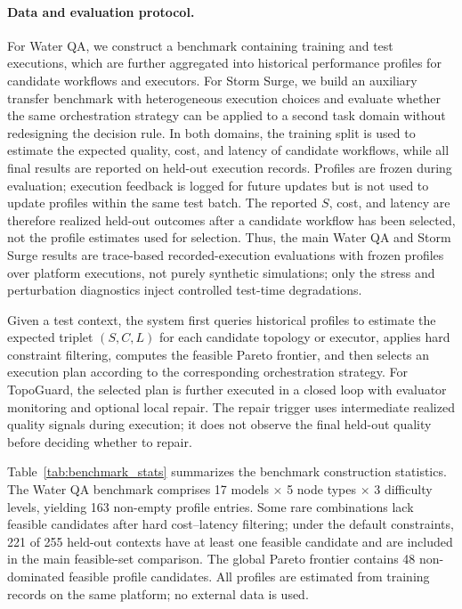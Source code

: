 \documentclass[acmsmall,review,anonymous]{acmart}
\begin{document}
\paragraph{Data and evaluation protocol.}
For Water QA, we construct a benchmark containing training and test executions, which are further aggregated into historical performance profiles for candidate workflows and executors. 
For Storm Surge, we build an auxiliary transfer benchmark with heterogeneous execution choices and evaluate whether the same orchestration strategy can be applied to a second task domain without redesigning the decision rule. 
In both domains, the training split is used to estimate the expected quality, cost, and latency of candidate workflows, while all final results are reported on held-out execution records. Profiles are frozen during evaluation; execution feedback is logged for future updates but is not used to update profiles within the same test batch.
The reported $S$, cost, and latency are therefore realized held-out outcomes after a candidate workflow has been selected, not the profile estimates used for selection.
Thus, the main Water QA and Storm Surge results are trace-based recorded-execution evaluations with frozen profiles over platform executions, not purely synthetic simulations; only the stress and perturbation diagnostics inject controlled test-time degradations.

Given a test context, the system first queries historical profiles to estimate the expected triplet $(S,C,L)$ for each candidate topology or executor, applies hard constraint filtering, computes the feasible Pareto frontier, and then selects an execution plan according to the corresponding orchestration strategy.
For TopoGuard, the selected plan is further executed in a closed loop with evaluator monitoring and optional local repair.
The repair trigger uses intermediate realized quality signals during execution; it does not observe the final held-out quality before deciding whether to repair.

Table~\ref{tab:benchmark_stats} summarizes the benchmark construction statistics. The Water QA benchmark comprises 17 models $\times$ 5 node types $\times$ 3 difficulty levels, yielding 163 non-empty profile entries. Some rare combinations lack feasible candidates after hard cost--latency filtering; under the default constraints, 221 of 255 held-out contexts have at least one feasible candidate and are included in the main feasible-set comparison. The global Pareto frontier contains 48 non-dominated feasible profile candidates. All profiles are estimated from training records on the same platform; no external data is used.
\end{document}
